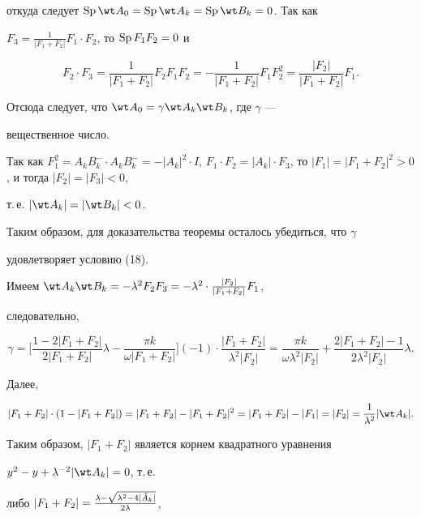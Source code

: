 откуда следует $\SP\wt A_0=\SP\wt A_k=\SP\wt B_k=0$. Так как 


$F_3=\frac{1}{|F_1+F_2|}F_1\cdot F_2$, то $\operatorname{Sp} F_1F_2=0$ и 


$$ 


F_2\cdot F_3=\frac{1}{|F_1+F_2|}F_2F_1F_2= 


-\frac{1}{|F_1+F_2|}F_1F^2_2=\frac{|F_2|}{|F_1+F_2|}F_1. 


$$ 


Отсюда следует, что $\wt A_0=\gamma\wt A_k\wt B_k$, где $\gamma$ --- 


вещественное число. 


 


Так как $F^2_1=A_k B^-_k\cdot A_k B^-_k=-|A_k|^2\cdot I$, $F_1\cdot 


F_2=|A_k|\cdot F_3$, то $|F_1|=|F_1+F_2|^2>0$, и тогда $|F_2|=|F_3|<0$, 


т.\,е. $|\wt A_k|=|\wt B_k|<0$. 


Таким образом, для доказательства теоремы осталось убедиться, что $\gamma$ 


удовлетворяет условию (18). 


 


Имеем $\wt A_k\wt B_k=-\lambda^2F_2F_3= -\lambda^2\cdot 


\frac{|F_2|}{|F_1+F_2|}F_1$, 


следовательно, 


$$ 


\gamma=\bigg[\frac{1-2|F_1+F_2|}{2|F_1+F_2|}\lambda- 


\frac{\pi k}{\omega|F_1+F_2|}\bigg](-1)\cdot 


\frac{|F_1+F_2|}{\lambda^2|F_2|}=\frac{\pi k}{\omega\lambda^2|F_2|}+ 


\frac{2|F_1+F_2|-1}{2\lambda^2|F_2|}\lambda. 


$$ 


Далее, 


$$ 


|F_1+F_2|\cdot(1-|F_1+F_2|)=|F_1+F_2|-|F_1+F_2|^2= 


|F_1+F_2|-|F_1|=|F_2|=\frac{1}{\lambda^2}|\wt A_k|. 


$$ 


Таким образом, $|F_1+F_2|$ является корнем квадратного уравнения 


$y^2-y+\lambda^{-2}|\wt A_k|=0$, т.\,е. 


либо $|F_1+F_2|=\frac{\lambda-\sqrt{\lambda^2-4|\Tilde A_k|}}{2\lambda}$, 


